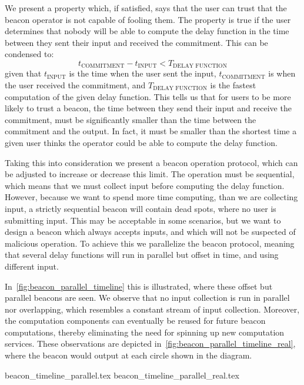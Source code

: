 We present a property which, if satisfied, says that the user can trust that the beacon operator is not capable of fooling them.
The property is true if the user determines that nobody will be able to compute the delay function in the time between they sent their input and received the commitment.
This can be condensed to:
\begin{equation}
    t_\text{COMMITMENT} - t_\text{INPUT} < T_\text{DELAY FUNCTION}
\end{equation}
given that $t_\text{INPUT}$ is the time when the user sent the input, $t_\text{COMMITMENT}$ is when the user received the commitment, and $T_\text{DELAY FUNCTION}$ is the fastest computation of the given delay function.
This tells us that for users to be more likely to trust a beacon, the time between they send their input and receive the commitment, must be significantly smaller than the time between the commitment and the output.
In fact, it must be smaller than the shortest time a given user thinks the operator could be able to compute the delay function.

Taking this into consideration we present a beacon operation protocol, which can be adjusted to increase or decrease this limit.
The operation must be sequential, which means that we must collect input before computing the delay function.
However, because we want to spend more time computing, than we are collecting input, a strictly sequential beacon will contain dead spots, where no user is submitting input.
This may be acceptable in some scenarios, but we want to design a beacon which always accepts inputs, and which will not be suspected of malicious operation.
To achieve this we parallelize the beacon protocol, meaning that several delay functions will run in parallel but offset in time, and using different input.

In~\cref{fig:beacon_parallel_timeline} this is illustrated, where these offset but parallel beacons are seen.
We observe that no input collection is run in parallel nor overlapping, which resembles a constant stream of input collection.
Moreover, the computation components can eventually be reused for future beacon computations, thereby eliminating the need for spinning up new computation services.
These observations are depicted in~\cref{fig:beacon_parallel_timeline_real}, where the beacon would output at each circle shown in the diagram.

{beacon_timeline_parallel.tex}
{beacon_timeline_parallel_real.tex}
